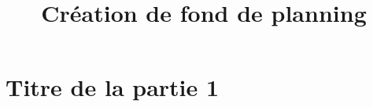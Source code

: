 \documentclass{polytech/polytech}
\title{Création de fond de planning}
\begin{document}
	\part{Titre de la partie 1}
\end{document}
